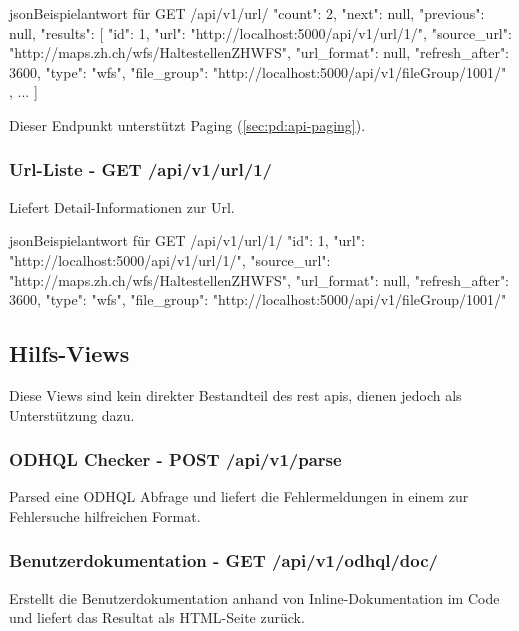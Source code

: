 \begin{srclst}{json}{Beispielantwort für GET /api/v1/url/}
{
    "count": 2, 
    "next": null, 
    "previous": null, 
    "results": [
        {
            "id": 1, 
            "url": "http://localhost:5000/api/v1/url/1/", 
            "source_url": "http://maps.zh.ch/wfs/HaltestellenZHWFS", 
            "url_format": null, 
            "refresh_after": 3600, 
            "type": "wfs", 
            "file_group": "http://localhost:5000/api/v1/fileGroup/1001/"
        }, 
        ...
    ]
}
\end{srclst}

Dieser Endpunkt unterstützt Paging (\cref{sec:pd:api-paging}).

\subsubsection{Url-Liste - GET /api/v1/url/1/}
Liefert Detail-Informationen zur Url.

\begin{srclst}{json}{Beispielantwort für GET /api/v1/url/1/}
{
    "id": 1, 
    "url": "http://localhost:5000/api/v1/url/1/", 
    "source_url": "http://maps.zh.ch/wfs/HaltestellenZHWFS", 
    "url_format": null, 
    "refresh_after": 3600, 
    "type": "wfs", 
    "file_group": "http://localhost:5000/api/v1/fileGroup/1001/"
}
\end{srclst}

\subsection{Hilfs-Views}
Diese Views sind kein direkter Bestandteil des \gls{rest} \acs{api}s, dienen jedoch als Unterstützung dazu.

\subsubsection{ODHQL Checker - POST /api/v1/parse} \label{sec:pd:api-parse}
Parsed eine ODHQL Abfrage und liefert die Fehlermeldungen in einem zur Fehlersuche hilfreichen Format.

\subsubsection{Benutzerdokumentation - GET /api/v1/odhql/doc/}
Erstellt die Benutzerdokumentation anhand von Inline-Dokumentation im Code und liefert das Resultat als HTML-Seite zurück.